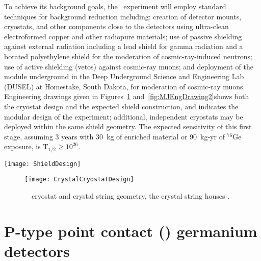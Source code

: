 To achieve its background goals, the \MJ~experiment will employ standard techniques for background reduction including: creation of detector mounts, cryostats, and other components close to the detectors using ultra-clean electroformed copper and other radiopure materials; use of passive shielding against external radiation including a lead shield for gamma radiation and a borated polyethylene shield for the moderation of cosmic-ray-induced neutrons; use of active shielding (vetos) against cosmic-ray muons; and deployment of the module underground in the Deep Underground Science and Engineering Lab (DUSEL) at Homestake, South Dakota, for moderation of cosmic-ray muons.  Engineering drawings given in Figures~\ref{fig:MJEngDrawing1} and~\ref{fig:MJEngDrawing2}shows both the cryostat design and the expected shield construction, and indicates the modular design of the experiment; additional, independent cryostats may be deployed within the same shield geometry.  
The expected sensitivity of this first stage, 
assuming 3 years with 30~kg of enriched material or 90~kg-yr of $^{76}$Ge
exposure, is T$_{1/2}\geq 10^{26}$.  

	
		\begin{sidewaysfigure}
			\centering		
			\def\figheight{0.45\textheight}
			\texttt{[image: ShieldDesign]}
			\caption[\MJ~\minmod~shield geometry]{\MJ~\minmod~shield geometry.  The modular design of the shield will 
			enable a phased deployment of cryostats, allowing detectors to be easily added after commission of the experiment.}
			\label{fig:MJEngDrawing2}
		\end{sidewaysfigure}
	
		\begin{figure}
			\centering		
			\def\figheight{0.45\textheight}
			\texttt{[image: CrystalCryostatDesign]}
			\caption[\MJ~\minmod~cryostat and crystal string geometry]{\MJ~\minmod~cryostat and crystal string geometry, the
			crystal string houses .}
			\label{fig:MJEngDrawing1}
		\end{figure}

	
	\section{P-type point contact (\ppc) germanium detectors}
	\label{sec:PPCDets}

